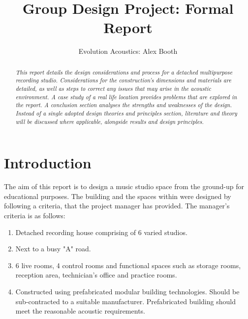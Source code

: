 \documentclass[10pt, twocolumn]{article}
\title{Group Design Project: Formal Report}
\author{Evolution Acoustics: Alex Booth}
\begin{document}
    \maketitle
    \begin{abstract}
        \it
        {
            This report details the design considerations and process for a detached multipurpose recording studio.
            Considerations for the construction's dimensions and materials are detailed, as well as steps to correct any issues that may arise in the acoustic environment.
            A case study of a real life location provides problems that are explored in the report.
            A conclusion section analyses the strengths and weaknesses of the design.
            Instead of a single adopted design theories and principles section, literature and theory will be discussed where applicable, alongside results and design principles.
        } 
    \end{abstract}
    \section{Introduction}
    The aim of this report is to design a music studio space from the ground-up for educational purposes.
    The building and the spaces within were designed by following a criteria, that the project manager has provided. 
    The manager's criteria is as follows:
    \begin{enumerate}
        \item Detached recording house comprising of 6 varied studios.
        \item Next to a busy "A" road.
        \item 6 live rooms, 4 control rooms and functional spaces such as storage rooms, reception area, technician's office and practice rooms.
        \item Constructed using prefabricated modular building technologies. Should be sub-contracted to a suitable manufacturer. Prefabricated building should meet the reasonable acoustic requirements.
    \end{enumerate}
\end{document}

